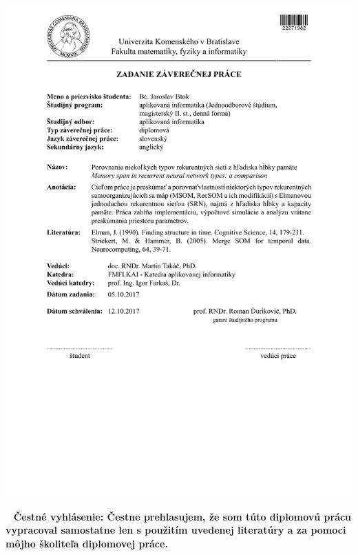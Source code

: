\documentclass[12pt, oneside]{book}
\begin{document}
\newpage 
\thispagestyle{empty}
\hspace{-2cm}\includegraphics[width=1.1\textwidth]{assets/zadanie_master_thesis}



\frontmatter

\setcounter{page}{3}
\newpage 
~
\vfill
{\bf Čestné vyhlásenie: Čestne prehlasujem, že som túto diplomovú prácu vypracoval samostatne len s použitím uvedenej literatúry a za pomoci môjho školiteľa diplomovej práce.}




 \setcounter{page}{3}
 \newpage 

 ~
\end{document}
